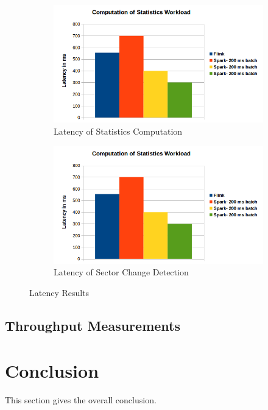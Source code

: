 \documentclass[]{article}
\begin{document}
\begin{figure}[h]
\begin{subfigure}{.5\textwidth}
  \centering
  \includegraphics[width=\linewidth]{latency1.png}
  \caption{Latency of Statistics Computation}

\end{subfigure}%
\begin{subfigure}{.5\textwidth}
  \centering
  \includegraphics[width=\linewidth]{latency1.png}
\caption{Latency of Sector Change Detection }

\end{subfigure}
\caption{Latency Results}
\label{fig:fig}
\end{figure}
\subsection{Throughput Measurements}



\section{Conclusion}
This section gives the overall conclusion.
\end{document}
